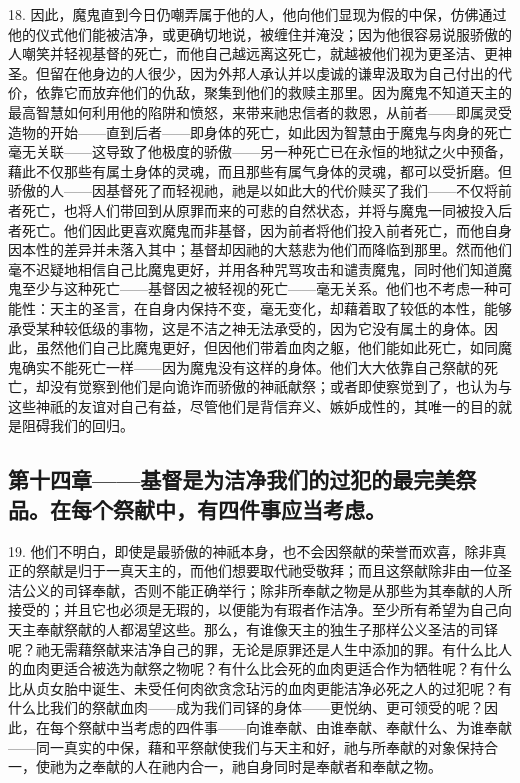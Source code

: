 18. 因此，魔鬼直到今日仍嘲弄属于他的人，他向他们显现为假的中保，仿佛通过他的仪式他们能被洁净，或更确切地说，被缠住并淹没；因为他很容易说服骄傲的人嘲笑并轻视基督的死亡，而他自己越远离这死亡，就越被他们视为更圣洁、更神圣。但留在他身边的人很少，因为外邦人承认并以虔诚的谦卑汲取为自己付出的代价，依靠它而放弃他们的仇敌，聚集到他们的救赎主那里。因为魔鬼不知道天主的最高智慧如何利用他的陷阱和愤怒，来带来祂忠信者的救恩，从前者——即属灵受造物的开始——直到后者——即身体的死亡，如此因为智慧由于魔鬼与肉身的死亡毫无关联——这导致了他极度的骄傲——另一种死亡已在永恒的地狱之火中预备，藉此不仅那些有属土身体的灵魂，而且那些有属气身体的灵魂，都可以受折磨。但骄傲的人——因基督死了而轻视祂，祂是以如此大的代价赎买了我们——不仅将前者死亡，也将人们带回到从原罪而来的可悲的自然状态，并将与魔鬼一同被投入后者死亡。他们因此更喜欢魔鬼而非基督，因为前者将他们投入前者死亡，而他自身因本性的差异并未落入其中；基督却因祂的大慈悲为他们而降临到那里。然而他们毫不迟疑地相信自己比魔鬼更好，并用各种咒骂攻击和谴责魔鬼，同时他们知道魔鬼至少与这种死亡——基督因之被轻视的死亡——毫无关系。他们也不考虑一种可能性：天主的圣言，在自身内保持不变，毫无变化，却藉着取了较低的本性，能够承受某种较低级的事物，这是不洁之神无法承受的，因为它没有属土的身体。因此，虽然他们自己比魔鬼更好，但因他们带着血肉之躯，他们能如此死亡，如同魔鬼确实不能死亡一样——因为魔鬼没有这样的身体。他们大大依靠自己祭献的死亡，却没有觉察到他们是向诡诈而骄傲的神祇献祭；或者即使察觉到了，也认为与这些神祇的友谊对自己有益，尽管他们是背信弃义、嫉妒成性的，其唯一的目的就是阻碍我们的回归。\par


\subsection{第十四章——基督是为洁净我们的过犯的最完美祭品。在每个祭献中，有四件事应当考虑。}

19. 他们不明白，即使是最骄傲的神祇本身，也不会因祭献的荣誉而欢喜，除非真正的祭献是归于一真天主的，而他们想要取代祂受敬拜；而且这祭献除非由一位圣洁公义的司铎奉献，否则不能正确举行；除非所奉献之物是从那些为其奉献的人所接受的；并且它也必须是无瑕的，以便能为有瑕者作洁净。至少所有希望为自己向天主奉献祭献的人都渴望这些。那么，有谁像天主的独生子那样公义圣洁的司铎呢？祂无需藉祭献来洁净自己的罪，无论是原罪还是人生中添加的罪。有什么比人的血肉更适合被选为献祭之物呢？有什么比会死的血肉更适合作为牺牲呢？有什么比从贞女胎中诞生、未受任何肉欲贪念玷污的血肉更能洁净必死之人的过犯呢？有什么比我们的祭献血肉——成为我们司铎的身体——更悦纳、更可领受的呢？因此，在每个祭献中当考虑的四件事——向谁奉献、由谁奉献、奉献什么、为谁奉献——同一真实的中保，藉和平祭献使我们与天主和好，祂与所奉献的对象保持合一，使祂为之奉献的人在祂内合一，祂自身同时是奉献者和奉献之物。\par

